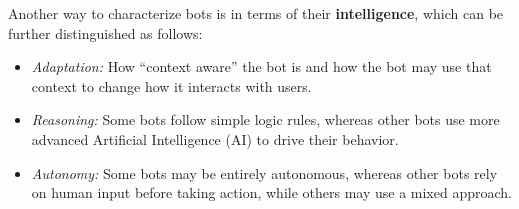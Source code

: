 \documentclass{sig-alternate}
\newcommand{\cl}[1]{\textcolor{blue}{{\it [Carly says: #1]}}}
\begin{document}
Another way to characterize bots is in terms of their \textbf{intelligence}, which can be further distinguished as follows:
\begin{itemize}
\item \emph{Adaptation:} How ``context aware'' the bot is and how the bot may use that context to change how it interacts with users. 
\item \emph{Reasoning:} Some bots follow simple logic rules,
whereas other bots use more advanced Artificial Intelligence (AI) to drive their behavior.
\item \emph{Autonomy:}  Some bots may be entirely autonomous, whereas other bots rely on human input before taking action, while others may use a mixed approach.  
\end{itemize}
\end{document}
